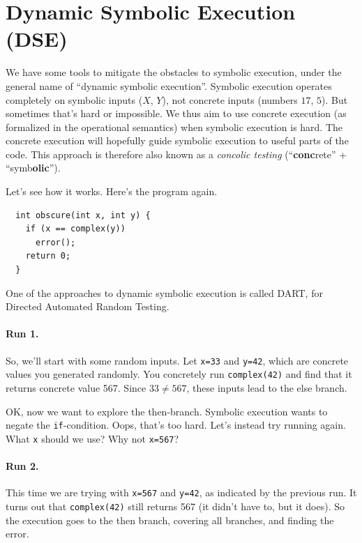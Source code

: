 \documentclass[11pt]{article}
\begin{document}
\section*{Dynamic Symbolic Execution (DSE)}
We have some tools to mitigate the obstacles to symbolic execution,
under the general name of ``dynamic symbolic execution''.  Symbolic
execution operates completely on symbolic inputs ($X$, $Y$), not
concrete inputs (numbers $17$, $5$).  But sometimes that's hard or
impossible. We thus aim to use concrete execution (as formalized in
the operational semantics) when symbolic execution is hard. The
concrete execution will hopefully guide symbolic execution to useful
parts of the code. This approach is therefore also known as a
\emph{concolic testing} (``\textbf{conc}rete'' +
``symb\textbf{olic}'').

Let's see how it works. Here's the program again.

\begin{lstlisting}
  int obscure(int x, int y) {
    if (x == complex(y))
      error();
    return 0;
  }
\end{lstlisting}
One of the approaches to dynamic symbolic execution is called DART,
for Directed Automated Random Testing. 

\paragraph{Run 1.} So, we'll start with some random inputs.
Let \texttt{x=33} and \texttt{y=42}, which are concrete values you
generated randomly. You concretely run \texttt{complex(42)} and find
that it returns concrete value 567. Since $33 \neq 567$, these inputs lead to the else
branch.

OK, now we want to explore the then-branch. Symbolic execution wants to negate the
\texttt{if}-condition. Oops, that's too hard. Let's instead try running again.
What \texttt{x} should we use? Why not \texttt{x=567}?

\paragraph{Run 2.} This time we are trying with \texttt{x=567} and \texttt{y=42},
as indicated by the previous run. It turns out that \texttt{complex(42)} still returns
567 (it didn't have to, but it does). So the execution goes to the then branch,
covering all branches, and finding the error.
\end{document}
